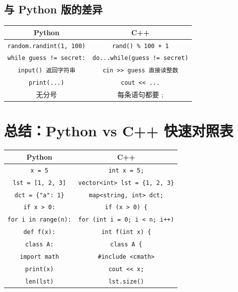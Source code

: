 \documentclass[a4paper,12pt]{ctexart}
\begin{document}
\subsection*{与 Python 版的差异}

\begin{center}
\begin{tabular}{|c|c|}
\hline
\textbf{Python} & \textbf{C++} \\ \hline
\texttt{random.randint(1, 100)} & \texttt{rand() \% 100 + 1} \\ \hline
\texttt{while guess != secret:} & \texttt{do...while(guess != secret)} \\ \hline
\texttt{input() 返回字符串} & \texttt{cin >> guess 直接读整数} \\ \hline
\texttt{print(...)} & \texttt{cout << ...} \\ \hline
无分号 & 每条语句都要 ; \\ \hline
\end{tabular}
\end{center}

\section*{总结：Python vs C++ 快速对照表}

\begin{center}
\begin{tabular}{|c|c|}
\hline
\textbf{Python} & \textbf{C++} \\ \hline
\texttt{x = 5} & \texttt{int x = 5;} \\ \hline
\texttt{lst = [1, 2, 3]} & \texttt{vector<int> lst = \{1, 2, 3\}} \\ \hline
\texttt{dct = \{"a": 1\}} & \texttt{map<string, int> dct;} \\ \hline
\texttt{if x > 0:} & \texttt{if (x > 0) \{} \\ \hline
\texttt{for i in range(n):} & \texttt{for (int i = 0; i < n; i++)} \\ \hline
\texttt{def f(x):} & \texttt{int f(int x) \{} \\ \hline
\texttt{class A:} & \texttt{class A \{} \\ \hline
\texttt{import math} & \texttt{\#include <cmath>} \\ \hline
\texttt{print(x)} & \texttt{cout << x;} \\ \hline
\texttt{len(lst)} & \texttt{lst.size()} \\ \hline
\end{tabular}
\end{center}
\end{document}
